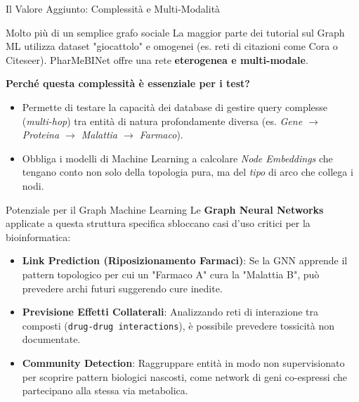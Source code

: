 \documentclass[aspectratio=169]{beamer}
\begin{document}
\begin{frame}{Il Valore Aggiunto: Complessità e Multi-Modalità}
    \begin{block}{\faDna \hspace{0.2cm} Molto più di un semplice grafo sociale}
        \small
        La maggior parte dei tutorial sul Graph ML utilizza dataset "giocattolo" e omogenei (es. reti di citazioni come Cora o Citeseer). PharMeBINet offre una rete \textbf{eterogenea e multi-modale}.
    \end{block}
    
    \vspace{0.3cm}
    \small
    \textbf{Perché questa complessità è essenziale per i test?}
    \begin{itemize}
        \item[\faNetworkWired] Permette di testare la capacità dei database di gestire query complesse (\textit{multi-hop}) tra entità di natura profondamente diversa (es. \textit{Gene $\rightarrow$ Proteina $\rightarrow$ Malattia $\rightarrow$ Farmaco}).
        \item[\faTags] Obbliga i modelli di Machine Learning a calcolare \textit{Node Embeddings} che tengano conto non solo della topologia pura, ma del \textit{tipo} di arco che collega i nodi.
    \end{itemize}
\end{frame}

\begin{frame}{Potenziale per il Graph Machine Learning}
    \small
    Le \textbf{Graph Neural Networks} applicate a questa struttura specifica sbloccano casi d'uso critici per la bioinformatica:
    
    \vspace{0.3cm}
    \begin{itemize}
        \item[\faMagic] \textbf{Link Prediction (Riposizionamento Farmaci)}: Se la GNN apprende il pattern topologico per cui un "Farmaco A" cura la "Malattia B", può prevedere archi futuri suggerendo cure inedite.
        \item[\faVial] \textbf{Previsione Effetti Collaterali}: Analizzando reti di interazione tra composti (\texttt{drug-drug interactions}), è possibile prevedere tossicità non documentate.
        \item[\faUsersCog] \textbf{Community Detection}: Raggruppare entità in modo non supervisionato per scoprire pattern biologici nascosti, come network di geni co-espressi che partecipano alla stessa via metabolica.
    \end{itemize}
\end{frame}
\end{document}
